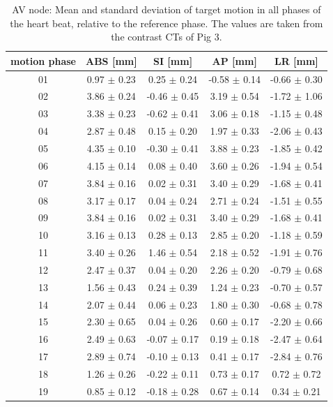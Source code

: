 \documentclass[type=dr, dr=rernat, accentcolor=tud7b,colorbacktitle, bigchapter, openright, twoside, 12pt ]{tudthesis}
\begin{document}
\begin{table}[htbp]
  \centering
    \tiny
  \caption{AV node: Mean and standard deviation of target motion in all phases of the heart beat, relative to the reference phase. The values are 
  taken from the contrast CTs of Pig 3.}
  \begin{tabular}{|c|c|c|c|c|}
    \hline\hline
    motion phase\rule{0pt}{2.6ex}\rule[-1.2ex]{0pt}{0pt} & ABS [mm] & SI [mm] & AP [mm] & LR [mm]\\
    \hline
01 &0.97 $\pm$ 0.23 &0.25 $\pm$ 0.24 &-0.58 $\pm$ 0.14 &-0.66 $\pm$ 0.30 \\
02 &3.86 $\pm$ 0.24 &-0.46 $\pm$ 0.45 &3.19 $\pm$ 0.54 &-1.72 $\pm$ 1.06 \\
03 &3.38 $\pm$ 0.23 &-0.62 $\pm$ 0.41 &3.06 $\pm$ 0.18 &-1.15 $\pm$ 0.48 \\
04 &2.87 $\pm$ 0.48 &0.15 $\pm$ 0.20 &1.97 $\pm$ 0.33 &-2.06 $\pm$ 0.43 \\
05 &4.35 $\pm$ 0.10 &-0.30 $\pm$ 0.41 &3.88 $\pm$ 0.23 &-1.85 $\pm$ 0.42 \\
06 &4.15 $\pm$ 0.14 &0.08 $\pm$ 0.40 &3.60 $\pm$ 0.26 &-1.94 $\pm$ 0.54 \\
07 &3.84 $\pm$ 0.16 &0.02 $\pm$ 0.31 &3.40 $\pm$ 0.29 &-1.68 $\pm$ 0.41 \\
08 &3.17 $\pm$ 0.17 &0.04 $\pm$ 0.24 &2.71 $\pm$ 0.24 &-1.51 $\pm$ 0.55 \\
09 &3.84 $\pm$ 0.16 &0.02 $\pm$ 0.31 &3.40 $\pm$ 0.29 &-1.68 $\pm$ 0.41 \\
10 &3.16 $\pm$ 0.13 &0.28 $\pm$ 0.13 &2.85 $\pm$ 0.20 &-1.18 $\pm$ 0.59 \\
11 &3.40 $\pm$ 0.26 &1.46 $\pm$ 0.54 &2.18 $\pm$ 0.52 &-1.91 $\pm$ 0.76 \\
12 &2.47 $\pm$ 0.37 &0.04 $\pm$ 0.20 &2.26 $\pm$ 0.20 &-0.79 $\pm$ 0.68 \\
13 &1.56 $\pm$ 0.43 &0.24 $\pm$ 0.39 &1.24 $\pm$ 0.23 &-0.70 $\pm$ 0.57 \\
14 &2.07 $\pm$ 0.44 &0.06 $\pm$ 0.23 &1.80 $\pm$ 0.30 &-0.68 $\pm$ 0.78 \\
15 &2.30 $\pm$ 0.65 &0.04 $\pm$ 0.26 &0.60 $\pm$ 0.17 &-2.20 $\pm$ 0.66 \\
16 &2.49 $\pm$ 0.63 &-0.07 $\pm$ 0.17 &0.19 $\pm$ 0.18 &-2.47 $\pm$ 0.64 \\
17 &2.89 $\pm$ 0.74 &-0.10 $\pm$ 0.13 &0.41 $\pm$ 0.17 &-2.84 $\pm$ 0.76 \\
18 &1.26 $\pm$ 0.26 &-0.22 $\pm$ 0.11 &0.73 $\pm$ 0.17 &0.72 $\pm$ 0.72 \\
19 &0.85 $\pm$ 0.12 &-0.18 $\pm$ 0.28 &0.67 $\pm$ 0.14 &0.34 $\pm$ 0.21 \\
    \hline\hline
  \end{tabular}
  \label{tab:motion:AV:Pig3}
\end{table}
\end{document}
